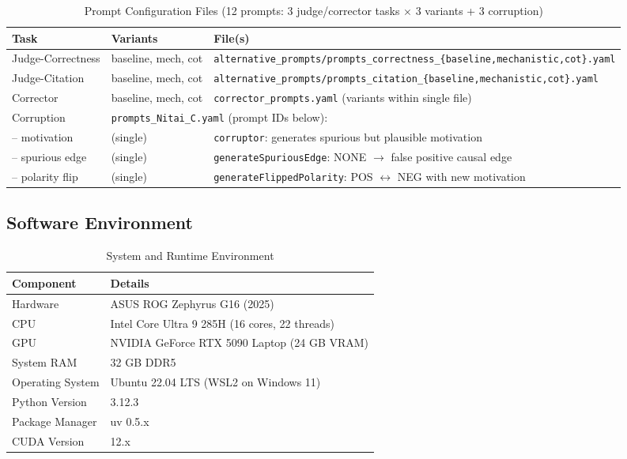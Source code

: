 \begin{table}[H]
\centering
\caption{Prompt Configuration Files (12 prompts: 3 judge/corrector tasks $\times$ 3 variants + 3 corruption)}
\label{tab:prompt_files}
\footnotesize
\begin{tabularx}{\textwidth}{@{}l l X@{}}
\toprule
\textbf{Task} & \textbf{Variants} & \textbf{File(s)} \\
\midrule
Judge-Correctness & baseline, mech, cot & \texttt{alternative\_prompts/prompts\_correctness\_\{baseline,mechanistic,cot\}.yaml} \\
Judge-Citation & baseline, mech, cot & \texttt{alternative\_prompts/prompts\_citation\_\{baseline,mechanistic,cot\}.yaml} \\
Corrector & baseline, mech, cot & \texttt{corrector\_prompts.yaml} (variants within single file) \\
\midrule
Corruption & \multicolumn{2}{l}{\texttt{prompts\_Nitai\_C.yaml} (prompt IDs below):} \\
\quad -- motivation & (single) & \texttt{corruptor}: generates spurious but plausible motivation \\
\quad -- spurious edge & (single) & \texttt{generateSpuriousEdge}: NONE $\rightarrow$ false positive causal edge \\
\quad -- polarity flip & (single) & \texttt{generateFlippedPolarity}: POS $\leftrightarrow$ NEG with new motivation \\
\bottomrule
\end{tabularx}
\end{table}

\subsection{Software Environment}
\label{sec:software_env}

\begin{table}[H]
\centering
\caption{System and Runtime Environment}
\label{tab:system_env}
\footnotesize
\begin{tabular}{@{}ll@{}}
\toprule
\textbf{Component} & \textbf{Details} \\
\midrule
Hardware & ASUS ROG Zephyrus G16 (2025) \\
CPU & Intel Core Ultra 9 285H (16 cores, 22 threads) \\
GPU & NVIDIA GeForce RTX 5090 Laptop (24 GB VRAM) \\
System RAM & 32 GB DDR5 \\
Operating System & Ubuntu 22.04 LTS (WSL2 on Windows 11) \\
Python Version & 3.12.3 \\
Package Manager & uv 0.5.x \\
CUDA Version & 12.x \\
\bottomrule
\end{tabular}
\end{table}

